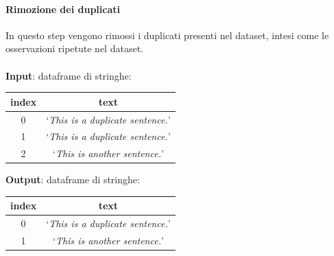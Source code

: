 \documentclass[12pt]{report}
\theoremstyle{definition}
\begin{document}
\paragraph{Rimozione dei duplicati}
In questo step vengono rimossi i duplicati presenti nel dataset, intesi come le osservazioni ripetute nel dataset.
\\
\\
\textbf{Input}: dataframe di stringhe:
\begin{center}
    \begin{tabular}{|c|c|}
    \hline
    \textbf{index} & \textbf{text} \\
    \hline
         0 & `\textit{This is a duplicate sentence.}'\\
         1 & `\textit{This is a duplicate sentence.}'\\
         2 & `\textit{This is another sentence.}'\\
    \hline
    \end{tabular}
\end{center}
\textbf{Output}: dataframe di stringhe:
\begin{center}
    \begin{tabular}{|c|c|}
    \hline
    \textbf{index} & \textbf{text} \\
    \hline
         0 & `\textit{This is a duplicate sentence.}'\\
         1 & `\textit{This is another sentence.}'\\
    \hline
    \end{tabular}
\end{center}
\end{document}
